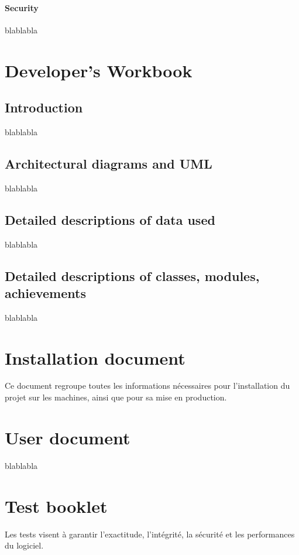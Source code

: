 \documentclass{polytech/polytech}
\numberwithin{figure}{chapter}
\begin{document}
\begin{appendix}
\subsubsection{Security}
blablabla


\chapter{Developer's Workbook}

\section{Introduction}

blablabla

\section{Architectural diagrams and UML}

blablabla

\section{Detailed descriptions of data used}

blablabla

\section{Detailed descriptions of classes, modules, achievements}

blablabla


\chapter{Installation document}

Ce document regroupe toutes les informations nécessaires
pour l’installation du projet sur les machines,
ainsi que pour sa mise en production.

\chapter{User document}

blablabla

\chapter{Test booklet}

Les tests  visent à garantir l'exactitude,
l'intégrité, la sécurité et les performances du logiciel. 


\end{appendix}
\end{document}
